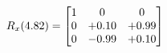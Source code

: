 \documentclass[preview]{standalone}
\begin{document}
\begin{align*}
\special{dvisvgm:raw <g id='unique000'>}R_{x}(4.82) = \begin{bmatrix}1 & 0 & 0 \\0 & +0.10 & +0.99 \\0 & -0.99 & +0.10\end{bmatrix}\special{dvisvgm:raw </g>}
\end{align*}
\end{document}
